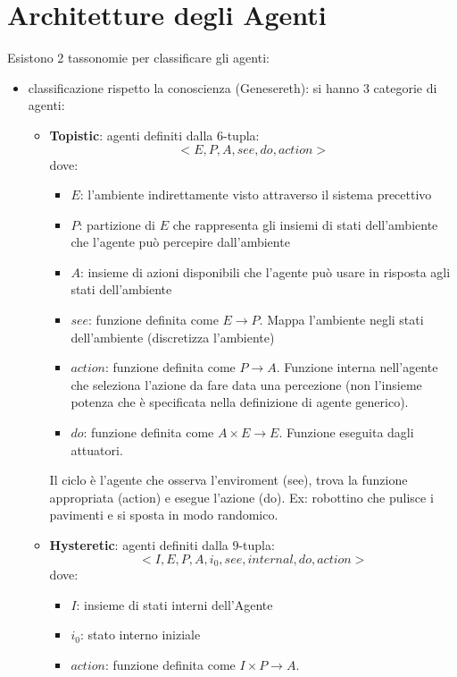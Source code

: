\section{Architetture degli Agenti}
Esistono 2 tassonomie per classificare gli agenti:
\begin{itemize}
    \item classificazione rispetto la conoscienza (Genesereth): si hanno $3$ categorie 
    di agenti:
    \begin{itemize}
        \item \textbf{Topistic}: agenti definiti dalla $6$-tupla:
        $$<E,P,A,see,do,action>$$
        dove:
        \begin{itemize}
            \item $E$: l'ambiente indirettamente visto attraverso il sistema precettivo
            \item $P$: partizione di $E$ che rappresenta gli insiemi di stati dell'ambiente
            che l'agente può percepire dall'ambiente 
            \item $A$: insieme di azioni disponibili che l'agente può usare in risposta 
            agli stati dell'ambiente
            \item $see$: funzione definita come $E\rightarrow P$. Mappa l'ambiente
            negli stati dell'ambiente (discretizza l'ambiente)
            \item $action$: funzione definita come $P\rightarrow A$. Funzione interna
                nell'agente che seleziona l'azione da fare data una percezione 
                (non l'insieme potenza che è specificata nella definizione di agente generico).
            \item $do$: funzione definita come $A\times E\rightarrow E$. Funzione
            eseguita dagli attuatori.
        \end{itemize} 
        Il ciclo è l'agente che osserva l'enviroment (see), trova la funzione appropriata
        (action) e esegue l'azione (do). Ex: robottino che pulisce i pavimenti e si 
        sposta in modo randomico. 
        \item \textbf{Hysteretic}: agenti definiti dalla $9$-tupla:
        $$<I,E,P,A,i_0,see,internal,do,action>$$
        dove:
        \begin{itemize}
            \item $I$: insieme di stati interni dell'Agente
            \item $i_0$: stato interno iniziale
            \item $action$: funzione definita come $I\times P\rightarrow A$. 

\end{itemize}
\end{itemize}
\end{itemize}
